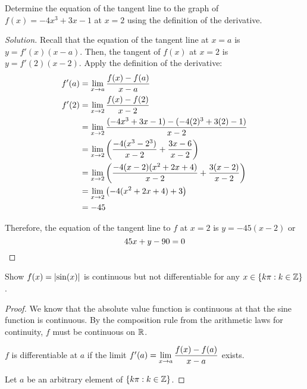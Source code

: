\begin{enumerate}[(a)]
\end{enumerate}

\question Determine the equation of the tangent line to the graph of $f(x)=-4x^3+3x-1$ at $x=2$ using the definition of the derivative.
\begin{proof}[Solution]
  Recall that the equation of the tangent line at $x=a$ is $y=f'(x)(x-a)$.
  Then, the tangent of $f(x)$ at $x=2$ is $y=f'(2)(x-2)$.
  Apply the definition of the derivative:
  \begin{align*}
    f'(a) & = \displaystyle\lim_{x\to a} \frac{f(x)-f(a)}{x-a}                                             \\
    f'(2) & = \displaystyle\lim_{x\to2} \frac{f(x)-f(2)}{x-2}                                             \\
          & = \displaystyle\lim_{x\to2} \frac{(-4x^3 + 3x - 1) - (-4(2)^3 + 3(2) - 1)}{x-2}               \\
          & = \displaystyle\lim_{x\to2} \left( \frac{-4(x^3-2^3)}{x-2} + \frac{3x-6}{x-2} \right)         \\
          & = \displaystyle\lim_{x\to2} \left( \frac{-4(x-2)(x^2+2x+4)}{x-2} + \frac{3(x-2)}{x-2} \right) \\
          & = \displaystyle\lim_{x\to2} \left( -4(x^2+2x+4) + 3 \right)                                   \\
          & = -45
  \end{align*}

  Therefore, the equation of the tangent line to $f$ at $x=2$ is $y=-45(x-2)$ or
  \[ 45x + y - 90 = 0 \qedhere \]
\end{proof}

\question Show $f(x) = \abs{\sin(x)}$ is continuous but not differentiable for any $x \in \{k\pi : k \in \mathbb{Z}\}$.
\begin{proof}
  We know that the absolute value function is continuous at that the sine function is continuous.
  By the composition rule from the arithmetic laws for continuity, $f$ must be continuous on $\mathbb{R}$.

  $f$ is differentiable at $a$ if the limit $f'(a)=\displaystyle\lim_{x\to a}\frac{f(x)-f(a)}{x-a}$ exists.

  Let $a$ be an arbitrary element of $\{k\pi : k \in \mathbb{Z}\}$.
\end{proof}


